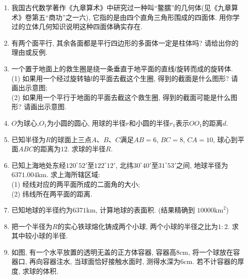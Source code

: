 \documentclass[10pt,a4paper]{article}
\begin{document}
\begin{enumerate}[1.]
\item 我国古代数学著作《九章算术》中研究过一种叫``鳖臑''的几何体(见《九章算术》卷第五``商功''之一六), 它指的是由四个直角三角形围成的四面体. 用你学过的立体几何知识说明这种四面体确实存在.
\item 有两个面平行, 其余各面都是平行四边形的多面体一定是柱体吗? 请给出你的理由或反例.
\item 一个置于地面上的救生圈是绕一条垂直于地平面的直线$l$旋转而成的旋转体.\\
(1) 如果用一个经过旋转轴$l$的平面去截这个生圈, 得到的截面是什么图形? 请画出示意图;\\
(2) 如果用一个平行于地面的平面去截这个救生圈, 得到的截面可能是什么图形? 请画出示意图.
\item $O$为球心,$O_1$为小圆的圆心, 用球的半径$r$和小圆的半径$r_1$表示$
OO_1$的距离$d$.
\item 已知半径为$R$的球面上三点$A$、$B$、$C$满足$AB=6$, $BC=8$, $CA=10$, 球心到平面$ABC$的距离为$12$. 求球的半径$R$.
\item 已知上海地处东经$120^\circ 52'$至$122^\circ 12'$, 北纬$30^\circ 40'$至$31^\circ 53'$之间, 地球半径为$6371.004\text{km}$. 求上海所辖区域:\\
(1) 经线对应的两平面所成的二面角的大小;\\
(2) 纬线所在两平面的距离.
\item 已知地球的半径约为$6371\text{km}$, 计算地球的表面积. (结果精确到
$10000\text{km}^2$)
\item 把一个半径为$R$的实心铁球熔化铸成两个小球, 两个小球的半径之比为$1:2$. 求其中较小球的半径.
\item 如图, 有一个水平放置的透明无盖的正方体容器, 容器高$8\text{cm}$, 将一个球放在容器口, 再向容器注水, 当球面恰好接触水面时, 测得水深为$
6\text{cm}$. 若不计容器的厚度, 求球的体积. 
\begin{center}
\end{center}
\end{enumerate}
\end{document}
